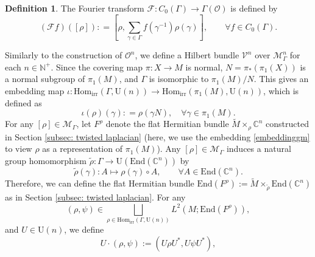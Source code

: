 \documentclass[11pt,oneside,reqno]{amsart}
\theoremstyle{definition}
\newtheorem{definition}{Definition}[section]
\numberwithin{equation}{section}
\theoremstyle{plain}
\begin{document}
\begin{definition}\label{defftrans}
    The Fourier transform $\mathcal{F}: C_0(\Gamma) \rightarrow \Gamma(\mathscr{O})$ is defined by
\begin{equation}\label{ftrans}
    (\mathcal{F} f) ([\rho]): = \left[ \rho,\sum_{\gamma\in \Gamma } f(\gamma^{-1}) \rho(\gamma) \right], \qquad \forall f \in C_0(\Gamma).
\end{equation}
\end{definition}


Similarly to the construction of $\mathscr{O}^n$, we define a Hilbert bundle $\mathcal{V}^n$ over $\mathcal{M}^n_{\Gamma}$ for each $n \in \mathbb{N}^+$. Since the covering map $\pi:X\rightarrow M$ is normal, $N = \pi_*(\pi_1(X))$ is a normal subgroup of $\pi_1(M)$, and $\Gamma$ is isomorphic to $\pi_1(M)/N$. This gives an embedding map $\iota: \mathrm{Hom}_{\mathrm{irr}} (\Gamma, \mathrm{U}(n)) \rightarrow \mathrm{Hom}_{\mathrm{irr}} (\pi_1(M), \mathrm{U}(n))$, which is defined as
\begin{equation}\label{embeddinggm}
    \iota(\rho) (\gamma) : = \rho (\gamma  N), \quad \forall \gamma\in \pi_1(M).
\end{equation}
For any $[\rho] \in \mathcal{M}_{\Gamma}$, let $F^{\rho}$ denote the flat Hermitian bundle $\widetilde{M} \times_{\rho}\mathbb{C}^n$ constructed in Section \ref{subsec: twisted laplacian} (here, we use the embedding \eqref{embeddinggm} to view $\rho$ as a representation of $\pi_1(M)$). Any $[\rho] \in \mathcal{M}_{\Gamma}$ induces a natural group homomorphism $\widetilde{\rho}: \Gamma \to \mathrm{U}(\mathrm{End}(\mathbb{C}^n))$ by
\begin{equation*}
    \widetilde{\rho}(\gamma):A\mapsto \rho(\gamma)\circ A, \qquad \forall A\in \mathrm{End}(\mathbb{C}^n).
\end{equation*}
Therefore, we can define the flat Hermitian bundle $\mathrm{End}(F^{\rho}):=\widetilde{M} \times_{\widetilde{\rho}}\mathrm{End}(\mathbb{C}^n)$ as in Section \ref{subsec: twisted laplacian}.
For any 
\begin{equation*}
   (\rho,\psi)  \in \bigsqcup_{\rho \in \mathrm{Hom}_{\mathrm{irr}}(\Gamma, \mathrm{U}(n))}L^2(M;\mathrm{End}(F^{\rho})),
\end{equation*}
and $U \in \mathrm{U}(n)$, we define
\begin{equation}
    U\cdot (\rho, \psi) := ( U\rho U^*, U\psi U^* ),
\end{equation}
\end{document}
